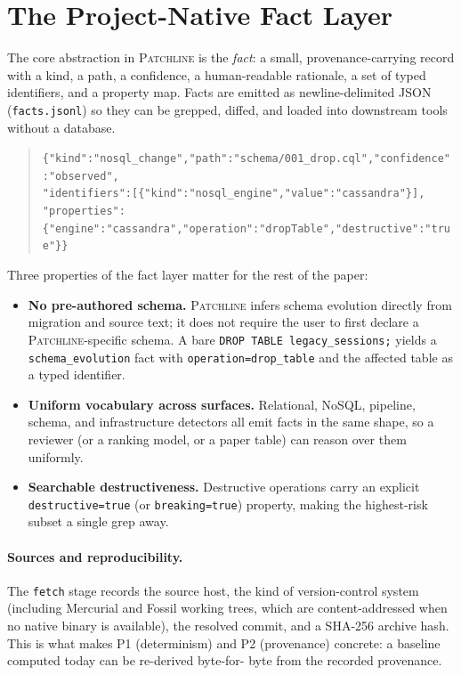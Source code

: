 \documentclass[11pt]{article}
\newcommand{\tool}{\textsc{Patchline}}
\newcommand{\code}[1]{\texttt{#1}}
\begin{document}
\section{The Project-Native Fact Layer}
\label{sec:facts}

The core abstraction in \tool{} is the \emph{fact}: a small, provenance-carrying record with a kind,
a path, a confidence, a human-readable rationale, a set of typed identifiers, and a property map.
Facts are emitted as newline-delimited JSON (\code{facts.jsonl}) so they can be grepped, diffed, and
loaded into downstream tools without a database.

\begin{quote}\small
\code{\{"kind":"nosql\_change","path":"schema/001\_drop.cql","confidence":"observed",}\\
\code{"identifiers":[\{"kind":"nosql\_engine","value":"cassandra"\}],}\\
\code{"properties":\{"engine":"cassandra","operation":"dropTable","destructive":"true"\}\}}
\end{quote}

\noindent
Three properties of the fact layer matter for the rest of the paper:

\begin{itemize}[leftmargin=1.4em]
  \item \textbf{No pre-authored schema.} \tool{} infers schema evolution directly from migration and
  source text; it does not require the user to first declare a \tool-specific schema. A bare
  \code{DROP TABLE legacy\_sessions;} yields a \code{schema\_evolution} fact with
  \code{operation=drop\_table} and the affected table as a typed identifier.
  \item \textbf{Uniform vocabulary across surfaces.} Relational, NoSQL, pipeline, schema, and
  infrastructure detectors all emit facts in the same shape, so a reviewer (or a ranking model, or a
  paper table) can reason over them uniformly.
  \item \textbf{Searchable destructiveness.} Destructive operations carry an explicit
  \code{destructive=true} (or \code{breaking=true}) property, making the highest-risk subset a single
  grep away.
\end{itemize}

\paragraph{Sources and reproducibility.} The \code{fetch} stage records the source host, the kind of
version-control system (including Mercurial and Fossil working trees, which are content-addressed when
no native binary is available), the resolved commit, and a SHA-256 archive hash. This is what makes
P1 (determinism) and P2 (provenance) concrete: a baseline computed today can be re-derived byte-for-
byte from the recorded provenance.
\end{document}
